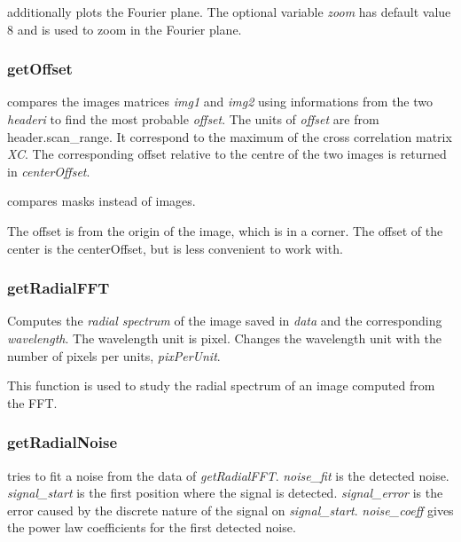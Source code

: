  additionally plots the Fourier plane. The optional variable \emph{zoom} has default value $8$ and is used to zoom in the Fourier plane.

\edf

\subsubsection{getOffset}
\bdf
{} compares the images matrices \emph{img1} and \emph{img2} using informations from the two \emph{headeri} to find the most probable \emph{offset}. The units of \emph{offset} are from header.scan\_range. It correspond to the maximum of the cross correlation matrix \emph{XC}. The corresponding offset relative to the centre of the two images is returned in \emph{centerOffset}.  


 compares masks instead of images.
\edf

The offset is from the origin of the image, which is in a corner. The offset of the center is the centerOffset, but is less convenient to work with.

\subsubsection{getRadialFFT}

\bdf
{} Computes the \emph{radial spectrum} of the image saved in \emph{data} and the corresponding \emph{wavelength}. The wavelength unit is pixel.
 Changes the wavelength unit with the number of pixels per units, \emph{pixPerUnit}.
\edf

This function is used to study the radial spectrum of an image computed from the FFT.

\subsubsection{getRadialNoise}

\bdf
{} tries to fit a noise from the data of \emph{getRadialFFT}. \emph{noise\_fit} is the detected noise. \emph{signal\_start} is the first position where the signal is detected. \emph{signal\_error} is the error caused by the discrete nature of the signal on \emph{signal\_start}. \emph{noise\_coeff} gives the power law coefficients for the first detected noise.

